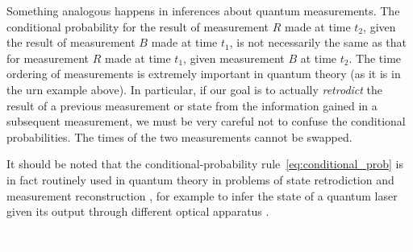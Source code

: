\documentclass[\ifafour a4paper,12pt,\else a5paper,10pt,\fi%
onecolumn,oneside,article,%
british%
]{memoir}
\makeatletter
\theoremstyle{remark}
\theoremstyle{innote}
\def\sum{\DOTSI\sumop\slimits@}
\newcommand*{\mathte}[1]{\textbf{\textit{\textsf{#1}}}}
\newcommand*{\de}{\partialup}%
\newcommand*{\p}{\mathrm{P}}%
\renewcommand*{\|}[1][]{\nonscript\,#1\vert\nonscript\;\mathopen{}}
\newcommand*{\sect}{\S}%
\newcommand*{\chaps}{chs}%
\newcommand*{\tsum}{\mathop{\textstyle\sum}\nolimits}
\newcommand*{\yM}{\mathte{M}}
\makeatother
\begin{document}
Something analogous \parencite[see][for an exact parallel
see]{portamana2003_r2004} happens in inferences about quantum measurements.
The conditional probability for the result of measurement $R$ made at time
$t_{2}$, given the result of measurement $B$ made at time $t_{1}$, is not
necessarily the same as that for measurement $R$ made at time $t_{1}$,
given measurement $B$ at time $t_{2}$. The time ordering of measurements is
extremely important in quantum theory (as it is in the urn example above).
In particular, if our goal is to actually \emph{retrodict} the result of
a previous measurement or state from the information gained in a subsequent
measurement, we must be very careful not to confuse the conditional
probabilities. The times of the two measurements cannot be swapped.

It should be noted that the conditional-probability
rule~\eqref{eq:conditional_prob} is in fact routinely used in quantum
theory in problems of state retrodiction and measurement reconstruction
\parencites{jones1991b,slater1995b}[\chaps~7,8]{demuynck2002b}{zimanetal2004_r2006,darianoetal2004}[see][\sect~1
for many further references]{maanssonetal2006},
for example to infer the state of a quantum laser given its output through
different optical apparatus \parencite{leonhardt1997}.

\textcolor{white}{If you find this you can claim a postcard from me.}



\end{document}
